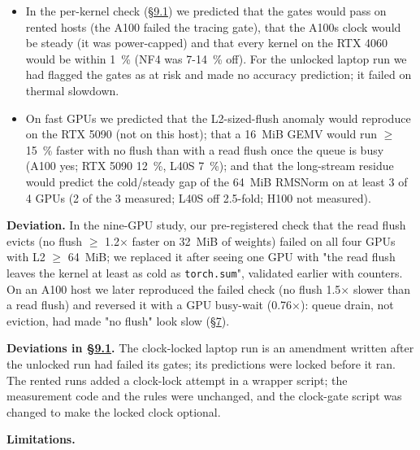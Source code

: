 \documentclass[11pt,a4paper]{article}
\begin{document}
\begin{itemize}
  step on all five GPUs and predict the int4 speedup within 5~\% on the three with \ensuremath{\ge} 40~MiB of L2; on the A100 and
  H100 it missed the int4 step by 17~\% and the speedup by 8-10~\%.
\item
  In the per-kernel check (\hyperref[kernel-by-kernel-does-a-single-kernel-benchmark-match-the-same-kernel-inside-the-decode-proxy]{\S{}9.1}) we predicted that the gates would pass on rented hosts (the A100 failed the tracing
  gate), that the A100\textquotesingle s clock would be steady (it was power-capped) and that every kernel on the RTX 4060 would be
  within 1~\% (NF4 was 7-14~\% off). For the unlocked laptop run we had flagged the gates as at risk and made no
  accuracy prediction; it failed on thermal slowdown.
\item
  On fast GPUs we predicted that the L2-sized-flush anomaly would reproduce on the RTX 5090 (not on this host);
  that a 16~MiB GEMV would run \ensuremath{\ge} 15~\% faster with no flush than with a read flush once the queue is busy (A100
  yes; RTX 5090 12~\%, L40S 7~\%); and that the long-stream residue would predict the cold/steady gap of the 64~MiB
  RMSNorm on at least 3 of 4 GPUs (2 of the 3 measured; L40S off 2.5-fold; H100 not measured).
\end{itemize}

\textbf{Deviation.} In the nine-GPU study, our pre-registered check that the read flush evicts (no flush \ensuremath{\ge} 1.2\ensuremath{\times} faster
on 32~MiB of weights) failed on all four GPUs with L2 \ensuremath{\ge} 64~MiB; we replaced it after seeing one GPU with "the read
flush leaves the kernel at least as cold as \texttt{torch.sum}", validated earlier with counters. On an A100 host we
later reproduced the failed check (no flush 1.5\ensuremath{\times} slower than a read flush) and reversed it with a GPU busy-wait
(0.76\ensuremath{\times}): queue drain, not eviction, had made "no flush" look slow (\hyperref[pitfall-2-queue-drain]{\S{}7}).

\textbf{Deviations in \hyperref[kernel-by-kernel-does-a-single-kernel-benchmark-match-the-same-kernel-inside-the-decode-proxy]{\S{}9.1}.} The clock-locked laptop run is an amendment written after the unlocked run had failed its
gates; its predictions were locked before it ran. The rented runs added a clock-lock attempt in a wrapper script;
the measurement code and the rules were unchanged, and the clock-gate script was changed to make the locked clock
optional.

\textbf{Limitations.}
\end{document}
